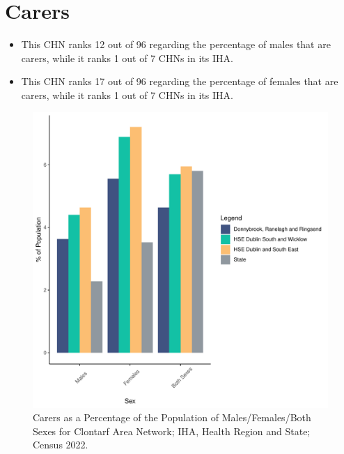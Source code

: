 \documentclass{article}
\begin{document}
\section{Carers}\label{sect:Carers}
\begin{itemize}
\item This CHN ranks  12 out of 96 regarding the percentage of males that are carers, while it ranks   1 out of 7 CHNs in its IHA.
\item This CHN ranks  17 out of 96 regarding the percentage of females that are carers, while it ranks   1 out of 7 CHNs in its IHA.
\end{itemize}
\begin{figure}[H]
	\centering
	\includegraphics[width = 150mm]{../figures/CareED.pdf}
	\caption{Carers as a Percentage of the Population of Males/Females/Both Sexes for Clontarf Area Network; IHA, Health Region and State; Census 2022.}
	\label{fig:2ae19629-1a6a-13a3-e055-000000000001}
	\end{figure}
\end{document}
